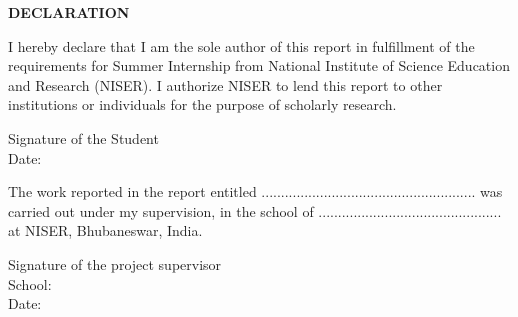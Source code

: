 \begin{center}
{\bf DECLARATION}
\end{center}

I hereby declare that I am the sole author of this report in  fulfillment of the requirements for Summer Internship from National Institute of Science Education and Research (NISER). I authorize NISER to lend this report to other institutions or individuals for the purpose of scholarly research.

\vskip1.0in

\hspace*{3.5in} {Signature of the Student} \\
\hspace*{3.5in} {Date:}

\vskip1.0in
\vskip1.0in

The work reported in the report entitled .......................................................  was carried out under my supervision, in the school of ............................................... at NISER, Bhubaneswar, India.

\vskip1.0in

\hspace*{3in} {Signature of the project supervisor} \\
\hspace*{3in} {School:}\\
\hspace*{3in} {Date:}